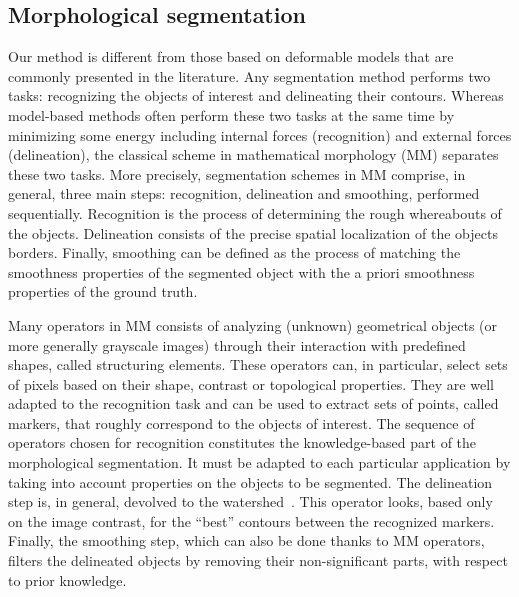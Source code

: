 \documentclass{llncs}
\begin{document}
\subsection{ Morphological segmentation}
Our method is different from those based on
deformable models that are commonly presented in the literature. Any
segmentation method performs two tasks: recognizing the objects of
interest and delineating their contours. Whereas model-based methods
often perform these two tasks at the same time by minimizing some
energy including internal forces (recognition) and external forces
(delineation), the classical scheme in mathematical morphology (MM)
separates these two tasks. More precisely, segmentation schemes in MM
\cite{BM93} comprise, in general, three main steps: recognition,
delineation and smoothing, performed sequentially. Recognition
is the process of determining the rough whereabouts of the
objects. Delineation consists of the precise spatial localization of
the objects borders. Finally, smoothing can be defined as the process of
matching the smoothness properties of the segmented object with the a
priori smoothness properties of the ground truth.

Many operators in MM consists of analyzing (unknown) geometrical objects (or
more generally grayscale images) through their interaction with predefined
shapes, called structuring elements. These operators can, in particular, select
sets of pixels based on their shape, contrast or topological properties. They
are well adapted to the recognition task and can be used to extract sets of
points, called markers, that roughly correspond to the objects of interest. The
sequence of operators chosen for recognition constitutes the knowledge-based
part of the morphological segmentation. It must be adapted to each particular
application by taking into account properties on the objects to be
segmented. The delineation step is, in general, devolved to the
watershed~\cite{VS91,CBNC09,CBNC10}. This operator looks, based only on the
image contrast, for the ``best'' contours between the recognized
markers. Finally, the smoothing step, which can also be done thanks to MM
operators, filters the delineated objects by removing their non-significant
parts, with respect to prior knowledge.
\end{document}
